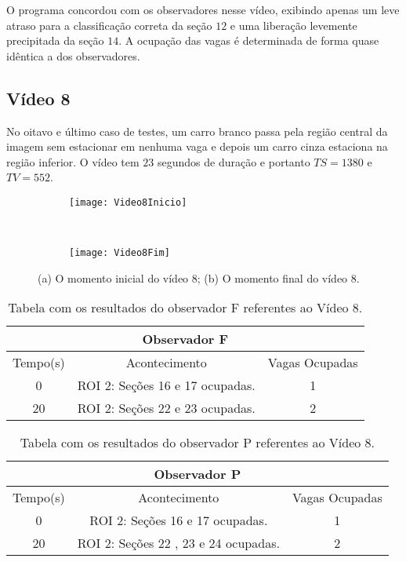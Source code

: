O programa concordou com os observadores nesse vídeo, exibindo apenas um leve atraso para a classificação correta da seção $12$ e uma liberação levemente precipitada da seção $14$. A ocupação das vagas é determinada de forma quase idêntica a dos observadores.

\subsection{Vídeo 8}

No oitavo e último caso de testes, um carro branco passa pela região central da imagem sem estacionar em nenhuma vaga e depois um carro cinza estaciona na região inferior. O vídeo tem $23$ segundos de duração e portanto $TS = 1380$ e $TV = 552$.

\begin{figure}[H]
\centering
\begin{subfigure}{.5\textwidth}
\centering
\texttt{[image: Video8Inicio]}
\caption{}
\end{subfigure}\
\begin{subfigure}{.5\textwidth}
\centering
\texttt{[image: Video8Fim]}
\caption{}
\end{subfigure}
\centering
\caption{(a) O momento inicial do vídeo 8; (b) O momento final do vídeo 8.}%
\label{}%
\end{figure}

\begin{table}[H]
\begin{center}
\begin{tabular}{|c||c||c|}
\hline
\multicolumn{3}{|c|}{Observador F}  \\ \hline \hline
Tempo(s) & Acontecimento & Vagas Ocupadas\\ \hline
0 & ROI 2: Seções 16 e 17 ocupadas. & 1 \\ \hline
20 & ROI 2: Seções 22 e 23 ocupadas. & 2 \\
\hline
\end{tabular}
\end{center}
\caption{Tabela com os resultados do observador F referentes ao Vídeo 8.}
\label{tab:video8F}
\end{table}


\begin{table}[H]
\begin{center}
\begin{tabular}{|c||c||c|}
\hline
\multicolumn{3}{|c|}{Observador P}  \\ \hline \hline
Tempo(s) & Acontecimento & Vagas Ocupadas\\ \hline
0 & ROI 2: Seções 16 e 17 ocupadas. & 1 \\ \hline
20 & ROI 2: Seções 22 , 23 e 24 ocupadas. & 2 \\
\hline
\end{tabular}
\end{center}
\caption{Tabela com os resultados do observador P referentes ao Vídeo 8.}
\label{tab:video8P}
\end{table}



